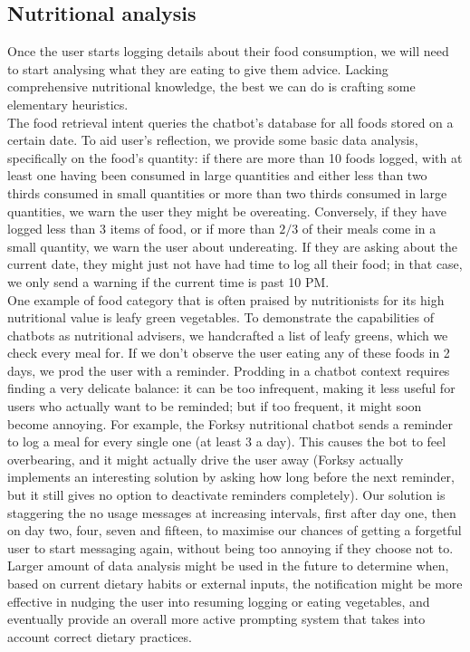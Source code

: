 \subsection{Nutritional analysis}
Once the user starts logging details about their food consumption, we will need to start analysing what they are eating to give them advice. Lacking comprehensive nutritional knowledge, the best we can do is crafting some elementary heuristics. \\
The food retrieval intent queries the chatbot's database for all foods stored on a certain date. To aid user's reflection, we provide some basic data analysis, specifically on the food's quantity: if there are more than 10 foods logged, with at least one having been consumed in large quantities and either less than two thirds consumed in small quantities or more than two thirds consumed in large quantities, we warn the user they might be overeating. Conversely, if they have logged less than 3 items of food, or if more than $2/3$ of their meals come in a small quantity, we warn the user about undereating. If they are asking about the current date, they might just not have had time to log all their food; in that case, we only send a warning if the current time is past 10 PM.\\
One example of food category that is often praised by nutritionists for its high nutritional value \cite{} is leafy green vegetables. To demonstrate the capabilities of chatbots as nutritional advisers, we handcrafted a list of leafy greens, which we check every meal for. If we don't observe the user eating any of these foods in 2 days, we prod the user with a reminder. Prodding in a chatbot context requires finding a very delicate balance: it can be too infrequent, making it less useful for users who actually want to be reminded; but if too frequent, it  might soon become annoying. For example, the Forksy nutritional chatbot \cite{forksywebsite} sends a reminder to log a meal for every single one (at least 3 a day). This causes the bot to feel overbearing, and it might actually drive the user away (Forksy actually implements an interesting solution by asking how long before the next reminder, but it still gives no option to deactivate reminders completely). Our solution is staggering the no usage messages at increasing intervals, first after day one, then on day two, four, seven and fifteen, to maximise our chances of getting a forgetful user to start messaging again, without being too annoying if they choose not to. Larger amount of data analysis might be used in the future to determine when, based on current dietary habits or external inputs, the notification might be more effective in nudging the user into resuming logging or eating vegetables, and eventually provide an overall more active prompting system that takes into account correct dietary practices.

